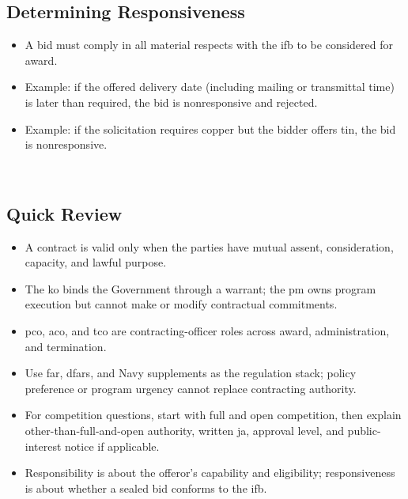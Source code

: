 \documentclass[../main.tex]{subfiles}
\begin{document}
\subsection{Determining Responsiveness}
\begin{itemize}
  \item A bid must comply in all material respects with the \ac{ifb} to be considered for award.
  \item Example: if the offered delivery date (including mailing or transmittal time) is later than required, the bid is nonresponsive and rejected.
  \item Example: if the solicitation requires copper but the bidder offers tin, the bid is nonresponsive.
\end{itemize}
~\autocite{edo-3-2-1-intro-contracting-2025}

\subsection{Quick Review}
\begin{itemize}
  \item A contract is valid only when the parties have mutual assent, consideration, capacity, and lawful purpose.
  \item The \ac{ko} binds the Government through a warrant; the \ac{pm} owns program execution but cannot make or modify contractual commitments.
  \item \ac{pco}, \ac{aco}, and \ac{tco} are contracting-officer roles across award, administration, and termination.
  \item Use \ac{far}, \ac{dfars}, and Navy supplements as the regulation stack; policy preference or program urgency cannot replace contracting authority.
  \item For competition questions, start with full and open competition, then explain other-than-full-and-open authority, written \ac{ja}, approval level, and public-interest notice if applicable.
  \item Responsibility is about the offeror's capability and eligibility; responsiveness is about whether a sealed bid conforms to the \ac{ifb}.
\end{itemize}

\end{document}
